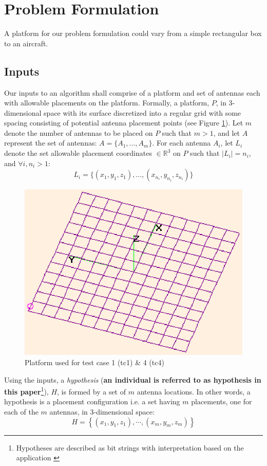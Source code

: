 \documentclass{sig-alternate}
\begin{document}
\section{Problem Formulation}
\label{sec:problem}
A platform for our problem formulation could vary from a simple rectangular box to an aircraft. 
\subsection{Inputs}
\label{sec:inputs}
Our inputs to an algorithm shall comprise of a platform and set of antennas each with allowable placements on the platform. Formally, a platform, $P$, in 3-dimensional space with its surface discretized into a regular grid with some spacing consisting of potential antenna placement points (see Figure \ref{fig:plat1}). Let $m$ denote the number of antennas to be placed on $P$ such that $m>1$, and let $A$ represent the set of antennas: $A = \{A_1, ..., A_m\}$.  For each antenna $A_i$, let $L_i$ denote the set allowable placement coordinates $\in \mathbb R^3$ on $P$ such that $\mid L_i \mid =n_i$, and $ \forall i, n_i>1$:
\[
L_i = \{(x_{1}, y_{1}, z_{1}), ..., (x_{n_i}, y_{n_i}, z_{n_i})\}
\]


\begin{figure}
    \begin{center}
        \includegraphics[width=.41\textwidth]{FIG/plate}
\end{center}
\caption{Platform used for test case 1 (tc1) \& 4 (tc4)}
\label{fig:plat1}
\end{figure}

Using the inputs, a \textit{hypothesis} (\textbf{an individual is referred to as hypothesis in this paper}\footnote{Hypotheses are described as bit strings with interpretation based on the application \cite{mitchell}}), $H$, is formed by a set of $m$ antenna locations. In other words, a hypothesis is a placement configuration i.e. a set having $m$ placements, one for each of the $m$ antennas, in 3-dimensional space:
\[
    H  = \left\{(x_1, y_1, z_1), \cdots, (x_m, y_m, z_m)\right\}
\]
\end{document}
